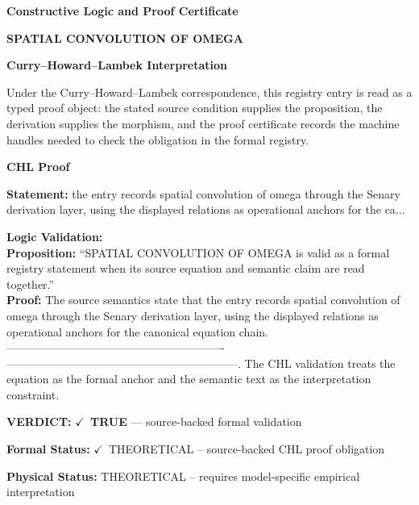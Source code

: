 \clearpage
\begingroup\tzpsupportsetup
\noindent\textbf{\fontsize{10.8pt}{12.8pt}\selectfont [ID 0575] Constructive Logic and Proof Certificate}\par
\noindent\textbf{\fontsize{10pt}{12pt}\selectfont SPATIAL CONVOLUTION OF OMEGA}\par
\vspace{0.45em}
\begingroup
\footnotesize
\setlength{\parskip}{0.22em}
\setlength{\parindent}{0pt}
\noindent\textbf{Curry--Howard--Lambek Interpretation}\par
Under the Curry--Howard--Lambek correspondence, this registry entry is read as a typed proof
object: the stated source condition supplies the proposition, the derivation supplies the
morphism, and the proof certificate records the machine handles needed to check the obligation
in the formal registry.

\vspace{0.45em}
\noindent\textbf{CHL Proof}\par
\textbf{Statement:} the entry records spatial convolution of omega through the Senary derivation layer,
using the displayed relations as operational anchors for the ca...

\textbf{Logic Validation:}\\
\textbf{Proposition:} ``SPATIAL CONVOLUTION OF OMEGA is valid as a formal registry statement when its source
equation and semantic claim are read together.''\\
\textbf{Proof:} The source semantics state that the entry records spatial convolution of omega through
the Senary derivation layer, using the displayed relations as operational anchors for
the canonical equation chain. ----------------------------------------------------------
--------------------------------------------------------------. The CHL validation
treats the equation as the formal anchor and the semantic text as the interpretation
constraint.

\textbf{VERDICT:} \ensuremath{\checkmark}\ \textbf{TRUE} --- source-backed formal validation

\textbf{Formal Status:} \ensuremath{\checkmark}\ THEORETICAL -- source-backed CHL proof obligation

\textbf{Physical Status:} THEORETICAL -- requires model-specific empirical interpretation
\par\vspace{0.45em}
\par
\ifTZPDarkEdition
{}
\fi
\endgroup
\endgroup

